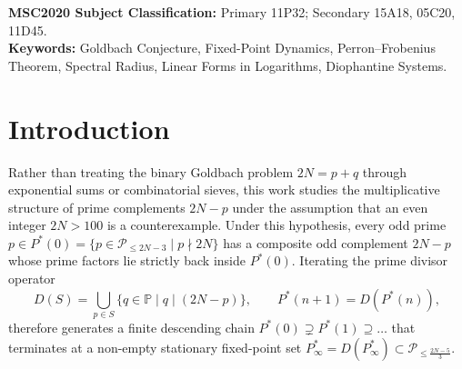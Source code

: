 \documentclass[11pt,a4paper]{article}
\theoremstyle{definition}
\begin{document}
\textbf{MSC2020 Subject Classification:} Primary 11P32; Secondary 15A18, 05C20, 11D45.\\
\textbf{Keywords:} Goldbach Conjecture, Fixed-Point Dynamics, Perron--Frobenius Theorem, Spectral Radius, Linear Forms in Logarithms, Diophantine Systems.

\section{Introduction}
\label{sec:intro}

Rather than treating the binary Goldbach problem $2N = p + q$ through exponential sums or combinatorial sieves, this work studies the multiplicative structure of prime complements $2N - p$ under the assumption that an even integer $2N > 100$ is a counterexample. Under this hypothesis, every odd prime $p \in P^*(0) = \{p \in \mathcal{P}_{\le 2N-3} \mid p \nmid 2N\}$ has a composite odd complement $2N - p$ whose prime factors lie strictly back inside $P^*(0)$. Iterating the prime divisor operator
\[
D(S) = \bigcup_{p \in S} \{q \in \mathbb{P} \mid q \mid (2N - p)\}, \qquad P^*(n+1) = D(P^*(n)),
\]
therefore generates a finite descending chain $P^*(0) \supsetneq P^*(1) \supseteq \dots$ that terminates at a non-empty stationary fixed-point set $P^*_\infty = D(P^*_\infty) \subset \mathcal{P}_{\le \frac{2N-5}{3}}$.
\end{document}
